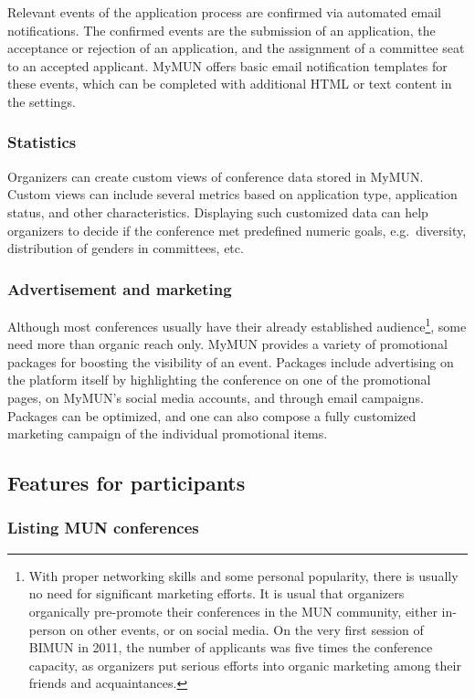 Relevant events of the application process are confirmed via automated email notifications. The confirmed events are the submission of an application, the acceptance or rejection of an application, and the assignment of a committee seat to an accepted applicant. MyMUN offers basic email notification templates for these events, which can be completed with additional HTML or text content in the settings.

\subsubsection{Statistics}

Organizers can create custom views of conference data stored in MyMUN. Custom views can include several metrics based on application type, application status, and other characteristics. Displaying such customized data can help organizers to decide if the conference met predefined numeric goals, e.g.\ diversity, distribution of genders in committees, etc.

\subsubsection{Advertisement and marketing}

Although most conferences usually have their already established audience\footnote{With proper networking skills and some personal popularity, there is usually no need for significant marketing efforts. It is usual that organizers organically pre-promote their conferences in the MUN community, either in-person on other events, or on social media. On the very first session of BIMUN in 2011, the number of applicants was five times the conference capacity, as organizers put serious efforts into organic marketing among their friends and acquaintances.}, some need more than organic reach only. MyMUN provides a variety of promotional packages for boosting the visibility of an event. Packages include advertising on the platform itself by highlighting the conference on one of the promotional pages, on MyMUN's social media accounts, and through email campaigns. Packages can be optimized, and one can also compose a fully customized marketing campaign of the individual promotional items.

\subsection{Features for participants}

\subsubsection{Listing MUN conferences}

